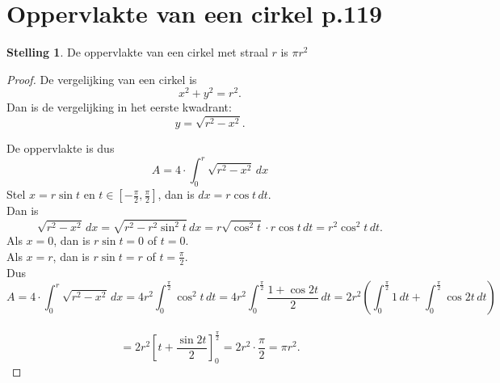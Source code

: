 \documentclass{article}
\theoremstyle{definition}
\newtheorem*{Stelling}{Stelling}
\begin{document}
\section{Oppervlakte van een cirkel p.119}
\begin{Stelling}
    De oppervlakte van een cirkel met straal $r$ is $\pi r^2$
\end{Stelling}

\begin{proof}
De vergelijking van een cirkel is $$x^2+y^2=r^2.$$
Dan is de vergelijking in het eerste kwadrant:
$$y=\sqrt{r^2-x^2}.$$
De oppervlakte is dus
$$A=4\cdot \int_0^r\sqrt{r^2-x^2}\, dx$$
Stel $x=r\sin t$ en $t\in\left[-\frac{\pi}{2},\frac{\pi}{2}\right]$, dan is $dx =r\cos t\, dt$. 
\\ Dan is $$\sqrt{r^2-x^2}\,dx = \sqrt{r^2-r^2\sin^2t}\, dx=r\sqrt{\cos^2t}\cdot r\cos t\,dt = r^2\cos^2t\,dt.$$
Als $x=0$, dan is $r\sin t = 0$ of $t=0$.\\
Als $x=r$, dan is $r\sin t = r$ of $t=\frac{\pi}{2}$.\\
Dus $$A = 4\cdot\int_0^r \sqrt{r^2-x^2}\, dx =4r^2\int_0^\frac{\pi}{2}\cos^2t\,dt = 4r^2\int_0^\frac{\pi}{2} \frac{1+\cos2t}{2}\,dt = 2r^2 \left(\displaystyle\int_{0}^{\frac{\pi}{2}}1\, dt +\displaystyle\int_{0}^{\frac{\pi}{2}}\cos2t\,dt\right)$$\\
$$= 2r^2\left[t + \frac{\sin2t}{2}\right]_0^\frac{\pi}{2}= 2r^2\cdot\frac{\pi}{2} = \pi r^2.$$


\end{proof}
\end{document}
